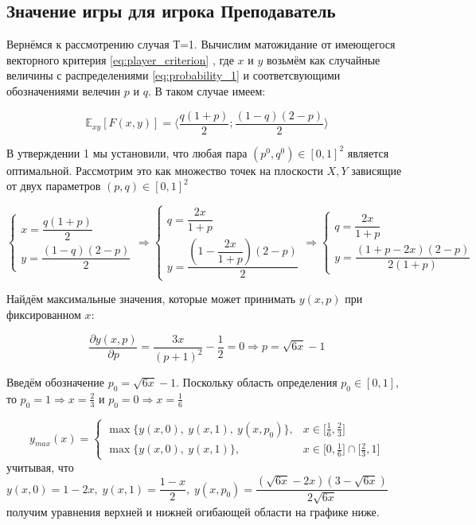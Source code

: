 \subsection{Значение игры для игрока Преподаватель}

Вернёмся к рассмотрению случая Т=1.
Вычислим матожидание от имеющегося векторного критерия 
\eqref{eq:player_criterion}
, где $x$ и $y$ возьмём как случайные величины с распределениями 
\eqref{eq:probability_1}
и соответсвующими обозначениями велечин $p$ и $q$. В таком случае имеем:

$$
	\mathbb{E}_{xy} [F(x,y)]=
	\Big \langle
		\dfrac{q(1+p)}{2};
		\dfrac{(1-q)(2-p)}{2}
	\Big\rangle
$$

В утверждении 1 мы установили, что любая пара
$(p^0, q^0) \in [0, 1]^{2}$ является оптимальной. 
Рассмотрим это как множество точек на плоскости $X,Y$ зависящие от двух
параметров $(p,q)\in[0,1]^2$

$$
	\begin{cases}
		x = \dfrac{q(1 + p)}{2} \\
		y = \dfrac{(1 - q)(2 - p)}{2}  
	\end{cases}
	\Rightarrow
	\begin{cases}
		q = \dfrac{2x}{1 + p} \\
		y = \dfrac{(1 - \dfrac{2x}{1 + p})(2 - p)}{2}		
	\end{cases}
	\Rightarrow
	\begin{cases}
		q = \dfrac{2x}{1 + p} \\
		y = \dfrac{(1 + p - 2x)(2 - p)}{2(1 + p)}
	\end{cases}
$$

Найдём максимальные значения, которые может принимать $y(x, p)$ при фиксированном $x$:

$$
	\dfrac{\partial y(x, p)}{\partial p}=\frac{3x}{(p+1)^2} - \frac{1}{2} = 0 
	\Rightarrow
	p = \sqrt{6x} - 1
$$

Введём обозначение $p_0 = \sqrt{6x} - 1$. Поскольку область определения 
$p_0 \in [0, 1]$, то $p_0 = 1 \Rightarrow x = \frac{2}{3}$ и 
$p_0 = 0 \Rightarrow x = \frac{1}{6}$
 
$$
	y_{max}(x) = 
	\begin{cases}
		\max \{ y(x, 0), \: y(x, 1), \: y(x, p_0) \}, & 
		x \in \big[ \frac{1}{6}, \frac{2}{3} \big]
		\\
		\max \{ y(x, 0), \: y(x, 1) \}, &
		x \in \big[0, \frac{1}{6} \big] \cap \big[\frac{2}{3}, 1\big]
	\end{cases}
$$
учитывая, что
$
	y(x, 0) = 1 - 2x, \;
	y(x, 1) = \dfrac{1 - x}{2}, \;  	
	y(x, p_0) = \dfrac{(\sqrt{6x} - 2x)(3 - \sqrt{6x})}{2 \sqrt{6x}}
$
получим уравнения верхней и нижней огибающей области на графике ниже.


